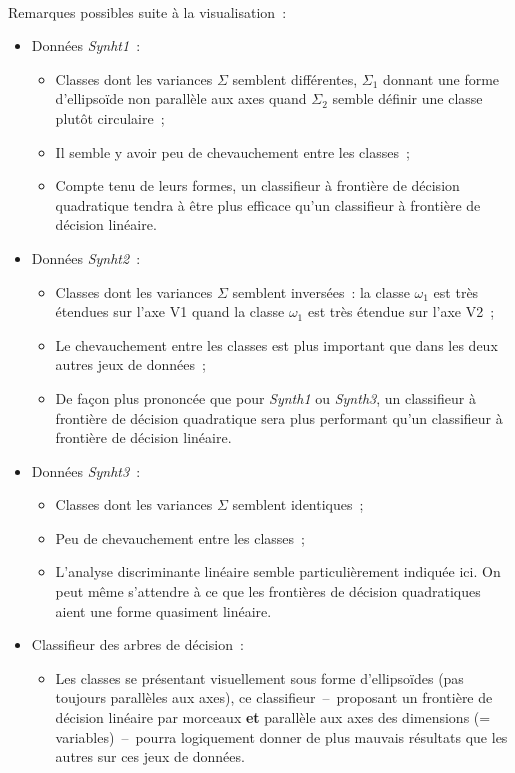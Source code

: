 \documentclass[a4paper,10pt]{report}
\begin{document}
~\\
Remarques possibles suite à la visualisation~:
\begin{itemize}
	\item Données \textit{Synht1}~:
	\begin{itemize}
		\item Classes dont les variances $\Sigma$ semblent différentes, $\Sigma_1$ donnant une forme d'ellipsoïde non parallèle aux axes quand $\Sigma_2$ semble définir une classe plutôt circulaire~;
		\item Il semble y avoir peu de chevauchement entre les classes~;
		\item Compte tenu de leurs formes, un classifieur à frontière de décision quadratique tendra à être plus efficace qu'un classifieur à frontière de décision linéaire.
	\end{itemize}
	\item Données \textit{Synht2}~:
	\begin{itemize}
		\item Classes dont les variances $\Sigma$ semblent inversées~: la classe $\omega_1$ est très étendues sur l'axe V1 quand la classe $\omega_1$ est très étendue sur l'axe V2~;
		\item Le chevauchement entre les classes est plus important que dans les deux autres jeux de données~;
		\item De façon plus prononcée que pour \textit{Synth1} ou \textit{Synth3}, un classifieur à frontière de décision quadratique sera plus performant qu'un classifieur à frontière de décision linéaire.
	\end{itemize}
	\item Données \textit{Synht3}~:
	\begin{itemize}
		\item Classes dont les variances $\Sigma$ semblent identiques~;
		\item Peu de chevauchement entre les classes~;
		\item L'analyse discriminante linéaire semble particulièrement indiquée ici. On peut même s'attendre à ce que les frontières de décision quadratiques aient une forme quasiment linéaire.
	\end{itemize}
	\item Classifieur des arbres de décision~:
		\begin{itemize}
			\item Les classes se présentant visuellement sous forme d'ellipsoïdes (pas toujours parallèles aux axes), ce classifieur~–~proposant un frontière de décision linéaire par morceaux \textbf{et} parallèle aux axes des dimensions (= variables)~–~pourra logiquement donner de plus mauvais résultats que les autres sur ces jeux de données.
		\end{itemize}
\end{itemize}
\end{document}
